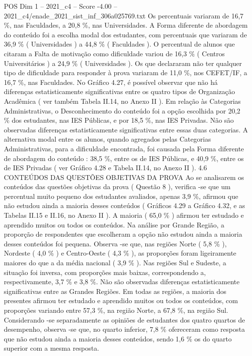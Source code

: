 \begin{textsample}{POS Dim 1 – 2021\_c4 – Score -4.00 – 2021\_c4/enade\_2021\_sist\_inf\_306a025769.txt}
Os percentuais variaram de 16,7 \%, nas Faculdades, a 20,8 \%, nas Universidades.
A Forma diferente de abordagem do conteúdo foi a escolha modal dos estudantes, com percentuais que variaram de 36,9 \% ( Universidades ) a 44,8 \% ( Faculdades ).
O percentual de alunos que citaram a Falta de motivação como dificuldade variou de 16,3 \% ( Centros Universitários ) a 24,9 \% ( Universidades ).
Os que declararam não ter qualquer tipo de dificuldade para responder à prova variaram de 11,0 \%, nos CEFET/IF, a 16,7 \%, nas Faculdades.
No Gráfico 4.27, é possível observar que não há diferenças estatisticamente significativas entre os quatro tipos de Organização Acadêmica ( ver também Tabela II.14, no Anexo II ).
Em relação às Categorias Administrativas, o Desconhecimento do conteúdo foi a opção escolhida por 20,2 \% dos estudantes, nas IES Públicas, e por 18,5 \%, nas IES Privadas.
Não são observadas diferenças estatisticamente significativas entre essas duas categorias.
A alternativa modal entre os alunos, quando agregados pelas Categorias Administrativas, para a dificuldade encontrada, foi causada pela Forma diferente de abordagem do conteúdo : 38,5 \%, entre os de IES Públicas, e 40,9 \%, entre os de IES Privadas ( ver Gráfico 4.28 e Tabela II.14, no Anexo II ). 4.6 CONTEÚDOS DAS QUESTÕES OBJETIVAS DA PROVA Ao se analisarem os conteúdos das questões objetivas da prova ( Questão 8 ), verifica -se que um percentual muito pequeno dos estudantes avaliados, apenas 3,9 \%, afirmou que não estudou ainda a maioria desses conteúdos ( Gráficos 4.29 a Gráfico 4.32, e as Tabelas II.15 e II.16, no Anexo II ).
A maioria ( 65,0 \% ) afirmou ter estudado e aprendido muitos ou todos os conteúdos.
Na análise por Grande Região, a proporção de respondentes que escolheram a opção não estudou ainda a maioria desses conteúdos foi pequena.
Observa -se que, nas regiões Norte ( 5,8 \% ), Nordeste ( 4,0 \% ) e Centro-Oeste ( 4,3 \% ), as proporções foram ligeiramente maiores do que a da média nacional ( 3,9 \% ).
Nas regiões Sul e Sudeste, a situação foi inversa, com proporções mais baixas, correspondendo a, respectivamente, 3,7 \% e 3,8 \%.
Não são observadas diferenças estatisticamente significativas entre as Grandes Regiões.
Em todas as regiões, a maioria dos presentes afirmou ter estudado e aprendido muitos ou todos os conteúdos, com proporções variando entre 57,3 \%, na região Norte, a 67,8 \%, na região Sul.
Considerando -se separadamente as opiniões de estudantes dos quatro quartos de desempenho, observa -se que, no quarto inferior, 7,8 \% ofereceram como resposta que não estudou ainda a maioria desses conteúdos, sendo 1,6 \% os do quarto superior com a mesma resposta.

\end{textsample}
